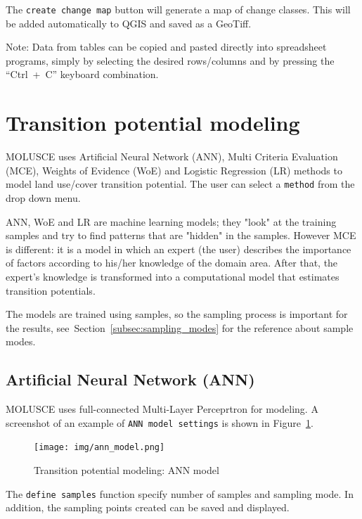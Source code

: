 \documentclass{report}
\begin{document}
The \verb+create change map+ button will generate a map of change classes. This will be added
automatically to QGIS and saved as a GeoTiff.

Note: Data from tables can be copied and pasted directly into spreadsheet programs, simply by
selecting the desired rows/columns and by pressing the “Ctrl~+~C” keyboard combination.

\section{Transition potential modeling}
MOLUSCE uses Artificial Neural Network (ANN), Multi Criteria Evaluation (MCE), Weights of
Evidence (WoE) and Logistic Regression (LR) methods to model land use/cover transition
potential. The user can select a \verb+method+ from the drop down menu.


ANN, WoE and LR are machine learning models; they "look" at the training samples and try 
to find patterns that are "hidden" in the samples. However MCE is different: 
it is a model in which an expert (the user) describes the importance of factors
according to his/her knowledge of the domain area. After that, the expert's knowledge is transformed into
a computational model that estimates transition potentials.

The models are trained using samples, so the sampling process is important for the results, see~Section~\ref{subsec:sampling_modes} for the reference about sample modes.


\subsection{Artificial Neural Network (ANN)}
MOLUSCE uses full-connected Multi-Layer Perceprtron for modeling.
A screenshot of an example of \verb+ANN model settings+ is shown in Figure~\ref{fig:ann_model}.

\begin{figure}[h!]
\centering
\texttt{[image: img/ann\_model.png]}
\caption{Transition potential modeling: ANN model}
\label{fig:ann_model}
\end{figure}

The \verb+define samples+ function specify number of samples and sampling mode. In addition, the
sampling points created can be saved and displayed.
\end{document}

